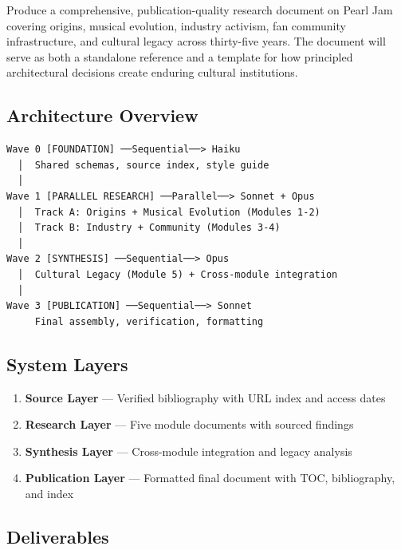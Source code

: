\documentclass[11pt,letterpaper]{article}
\begin{document}
Produce a comprehensive, publication-quality research document on Pearl Jam covering origins, musical evolution, industry activism, fan community infrastructure, and cultural legacy across thirty-five years. The document will serve as both a standalone reference and a template for how principled architectural decisions create enduring cultural institutions.

\subsection{Architecture Overview}

\begin{asciibox}
\begin{verbatim}
Wave 0 [FOUNDATION] ──Sequential──> Haiku
  │  Shared schemas, source index, style guide
  │
Wave 1 [PARALLEL RESEARCH] ──Parallel──> Sonnet + Opus
  │  Track A: Origins + Musical Evolution (Modules 1-2)
  │  Track B: Industry + Community (Modules 3-4)
  │
Wave 2 [SYNTHESIS] ──Sequential──> Opus
  │  Cultural Legacy (Module 5) + Cross-module integration
  │
Wave 3 [PUBLICATION] ──Sequential──> Sonnet
     Final assembly, verification, formatting
\end{verbatim}
\end{asciibox}

\subsection{System Layers}

\begin{enumerate}[label=\textbf{\arabic*.}]
\item \textbf{Source Layer} --- Verified bibliography with URL index and access dates
\item \textbf{Research Layer} --- Five module documents with sourced findings
\item \textbf{Synthesis Layer} --- Cross-module integration and legacy analysis
\item \textbf{Publication Layer} --- Formatted final document with TOC, bibliography, and index
\end{enumerate}

\subsection{Deliverables}
\end{document}
